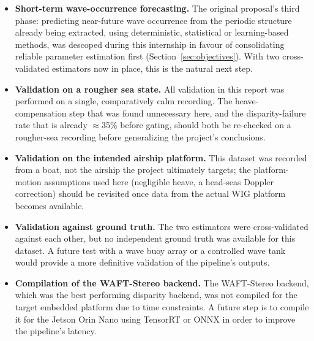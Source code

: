 \label{sec:future}

\begin{itemize}
	\item \textbf{Short-term wave-occurrence forecasting.} The original proposal's third phase: predicting near-future wave occurrence from the periodic structure already being extracted, using deterministic, statistical or learning-based methods, was descoped during this internship in favour of consolidating reliable parameter estimation first (Section~\ref{sec:objectives}). With two cross-validated estimators now in place, this is the natural next step.
	\item \textbf{Validation on a rougher sea state.} All validation in this report was performed on a single, comparatively calm recording. The heave-compensation step that was found unnecessary here, and the disparity-failure rate that is already $\approx$35\% before gating, should both be re-checked on a rougher-sea recording before generalizing the project's conclusions.
	\item \textbf{Validation on the intended airship platform.} This dataset was recorded from a boat, not the airship the project ultimately targets; the platform-motion assumptions used here (negligible heave, a head-seas Doppler correction) should be revisited once data from the actual WIG platform becomes available.
	\item \textbf{Validation against ground truth.} The two estimators were cross-validated against each other, but no independent ground truth was available for this dataset. A future test with a wave buoy array or a controlled wave tank would provide a more definitive validation of the pipeline's outputs.
	\item \textbf{Compilation of the WAFT-Stereo backend.} The WAFT-Stereo backend, which was the best performing disparity backend, was not compiled for the target embedded platform due to time constraints. A future step is to compile it for the Jetson Orin Nano using TensorRT or ONNX in order to improve the pipeline's latency.
\end{itemize}
